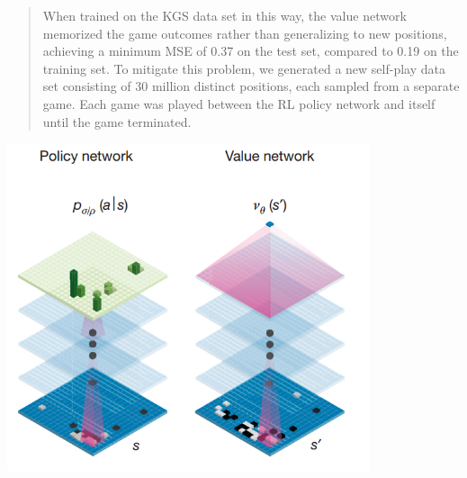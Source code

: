 \documentclass{beamer}
\begin{document}
\begin{frame}
  \begin{quote}
    When trained
on the KGS data set in this way, the value network memorized the
game outcomes rather than generalizing to new positions, achieving a
minimum MSE of 0.37 on the test set, compared to 0.19 on the training
set. To mitigate this problem, we generated a new self-play data set
consisting of 30 million distinct positions, each sampled from a separate
game. Each game was played between the RL policy network and
itself until the game terminated.
  \end{quote}
\end{frame}





\begin{frame}
  \begin{center}
    \includegraphics[width=0.8\textwidth]{alphago/conv}
  \end{center}
\end{frame}

\section{}
\end{document}
